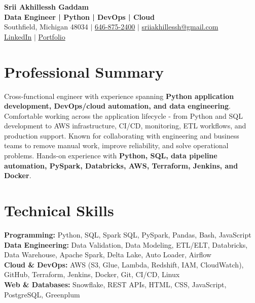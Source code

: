 \documentclass[letterpaper,10pt]{article}
\begin{document}
\fontsize{9.35pt}{10.45pt}\selectfont

\begin{center}
    {\LARGE \textbf{Srii Akhillessh Gaddam}} \\[-1pt]
    \textbf{Data Engineer | Python | DevOps | Cloud} \\[2pt]
    Southfield, Michigan 48034 $|$
    \href{tel:6468752400}{646-875-2400} $|$
    \href{mailto:sriiakhillessh@gmail.com}{sriiakhillessh@gmail.com} \\[1pt]
    \href{https://www.linkedin.com/in/srii-akhiilessh-gaddam-b48668191/}{LinkedIn} $|$
    \href{https://sriiakhillesshg.github.io/portfolio/}{Portfolio}
\end{center}
\vspace{-8pt}

\section{Professional Summary}
\small{Cross-functional engineer with experience spanning \textbf{Python application development, DevOps/cloud automation, and data engineering}. Comfortable working across the application lifecycle - from Python and SQL development to AWS infrastructure, CI/CD, monitoring, ETL workflows, and production support. Known for collaborating with engineering and business teams to remove manual work, improve reliability, and solve operational problems. Hands-on experience with \textbf{Python, SQL, data pipeline automation, PySpark, Databricks, AWS, Terraform, Jenkins, and Docker}.}

\section{Technical Skills}
\small{
\textbf{Programming:} Python, SQL, Spark SQL, PySpark, Pandas, Bash, JavaScript \\
\textbf{Data Engineering:} Data Validation, Data Modeling, ETL/ELT, Databricks, Data Warehouse, Apache Spark, Delta Lake, Auto Loader, Airflow \\
\textbf{Cloud \& DevOps:} AWS (S3, Glue, Lambda, Redshift, IAM, CloudWatch), GitHub, Terraform, Jenkins, Docker, Git, CI/CD, Linux \\
\textbf{Web \& Databases:} Snowflake, REST APIs, HTML, CSS, JavaScript, PostgreSQL, Greenplum
}
\end{document}
